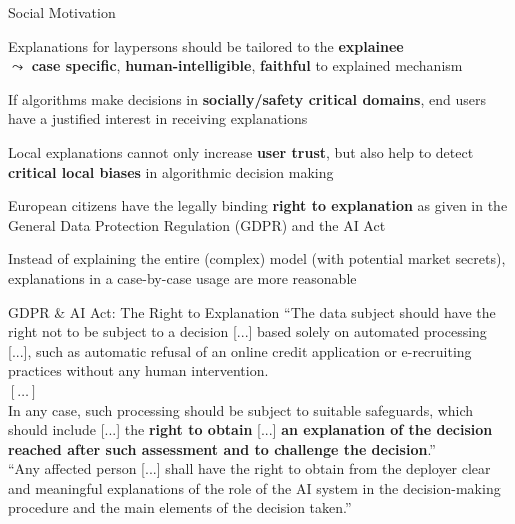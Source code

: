 \documentclass[10pt,compress,t,notes=noshow, xcolor=table]{beamer}
\begin{document}
\begin{framei}[align=top]{Social Motivation}
\item Explanations for laypersons should be tailored to the \textbf{explainee}\\ %
$\leadsto$ \textbf{case specific}, \textbf{human-intelligible}, \textbf{faithful} to explained mechanism
\pause
\item If algorithms make decisions in \textbf{socially/safety critical domains}, end users have a justified interest in receiving explanations
\pause
\item Local explanations cannot only increase \textbf{user trust}, but also help to detect \textbf{critical local biases} in algorithmic decision making
\pause
\item European citizens have the legally binding \textbf{right to explanation} as given in the General Data Protection Regulation (GDPR) and the AI Act
\begin{itemizeS}
\item[$\leadsto$] Instead of explaining the entire (complex) model (with potential market secrets), explanations in a case-by-case usage are more reasonable
\end{itemizeS}
\end{framei}


\begin{framev}[align=top]{GDPR \& AI Act: The Right to Explanation}
``The data subject should have the right not to be subject to a decision
    [...] based solely on automated processing [...],
such as automatic refusal of an online credit application or e-recruiting practices without any human intervention.
\\
$[\ldots]$\\
In any case, such processing should be subject to suitable safeguards, which should include [...]
the \textbf{right to obtain} [...]
\textbf{an explanation of the decision reached after such assessment and to challenge the decision}.''
\hfill {}
\spacer[0.25]\\
``Any affected person [...]
shall have the right to obtain from the deployer clear and meaningful explanations of the role of the AI system in the decision-making procedure and the main elements of the decision taken.''
\hfill {}
\end{framev}
\end{document}

